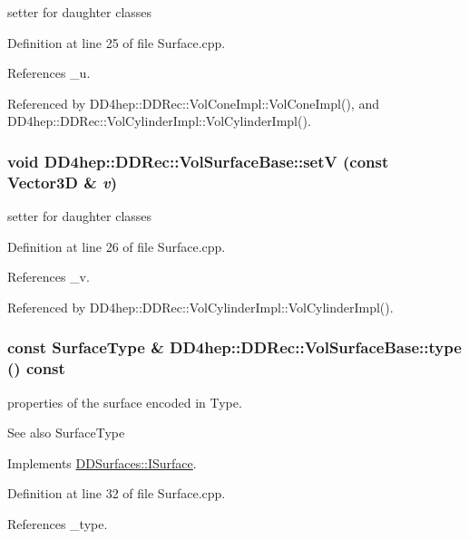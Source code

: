setter for daughter classes 

Definition at line 25 of file Surface.cpp.

References \_\-u.

Referenced by DD4hep::DDRec::VolConeImpl::VolConeImpl(), and DD4hep::DDRec::VolCylinderImpl::VolCylinderImpl().\hypertarget{class_d_d4hep_1_1_d_d_rec_1_1_vol_surface_base_a032025d40e5fee926713517ae36f5d4b}{
\subsubsection[{setV}]{\setlength{\rightskip}{0pt plus 5cm}void DD4hep::DDRec::VolSurfaceBase::setV (const {\bf Vector3D} \& {\em v})}}
\label{class_d_d4hep_1_1_d_d_rec_1_1_vol_surface_base_a032025d40e5fee926713517ae36f5d4b}


setter for daughter classes 

Definition at line 26 of file Surface.cpp.

References \_\-v.

Referenced by DD4hep::DDRec::VolCylinderImpl::VolCylinderImpl().\hypertarget{class_d_d4hep_1_1_d_d_rec_1_1_vol_surface_base_a32c932ec7f8a44321c9ea07ac56ab259}{
\subsubsection[{type}]{\setlength{\rightskip}{0pt plus 5cm}const {\bf SurfaceType} \& DD4hep::DDRec::VolSurfaceBase::type () const}}
\label{class_d_d4hep_1_1_d_d_rec_1_1_vol_surface_base_a32c932ec7f8a44321c9ea07ac56ab259}
properties of the surface encoded in Type. \begin{DoxySeeAlso}{See also}
SurfaceType 
\end{DoxySeeAlso}


Implements \hyperlink{class_d_d_surfaces_1_1_i_surface_aab772d11a61d7ae966d535be0da2a626}{DDSurfaces::ISurface}.

Definition at line 32 of file Surface.cpp.

References \_\-type.

